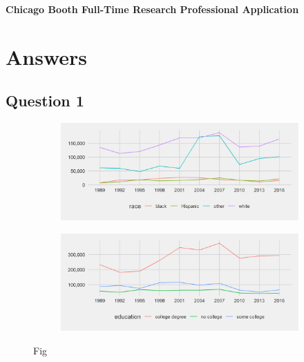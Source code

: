 \documentclass[]{scrartcl}
\begin{document}
\begin{center}
	{\bfseries \Large Chicago Booth Full-Time Research Professional Application}
\end{center}

\section*{Answers}

\subsection*{Question 1}


\begin{figure}[h]
	\centering
	\begin{subfigure}{.49\textwidth}
		\centering
		\includegraphics[width=\linewidth]{../median wealth finance_survey _by race .png}
	\end{subfigure}
\begin{subfigure}{.49\textwidth}
	\centering
	\includegraphics[width=\linewidth]{../median wealth finance_survey _by education .png}
\end{subfigure}
	\caption{Fig}\label{fig:1}
\end{figure}
\end{document}

